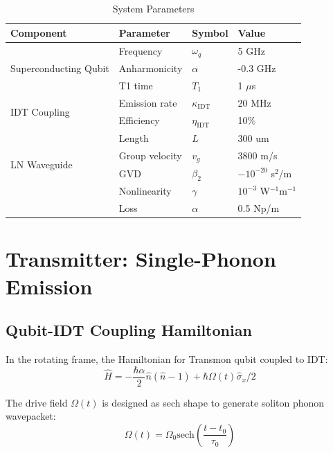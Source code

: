 \documentclass[12pt,a4paper]{article}
\theoremstyle{definition}
\begin{document}
\begin{table}[h]
\centering
\caption{System Parameters}
\begin{tabular}{llll}
\toprule
Component & Parameter & Symbol & Value \\
\midrule
\multirow{3}{*}{Superconducting Qubit} 
& Frequency & $\omega_q$ & 5 GHz \\
& Anharmonicity & $\alpha$ & -0.3 GHz \\
& T1 time & $T_1$ & 1 $\mu$s \\
\midrule
\multirow{2}{*}{IDT Coupling}
& Emission rate & $\kappa_{\text{IDT}}$ & 20 MHz \\
& Efficiency & $\eta_{\text{IDT}}$ & 10\% \\
\midrule
\multirow{4}{*}{LN Waveguide}
& Length & $L$ & 300 um \\
& Group velocity & $v_g$ & 3800 m/s \\
& GVD & $\beta_2$ & $-10^{-20}$ s$^2$/m \\
& Nonlinearity & $\gamma$ & $10^{-3}$ W$^{-1}$m$^{-1}$ \\
& Loss & $\alpha$ & 0.5 Np/m \\
\bottomrule
\end{tabular}
\end{table}

\section{Transmitter: Single-Phonon Emission}

\subsection{Qubit-IDT Coupling Hamiltonian}

In the rotating frame, the Hamiltonian for Transmon qubit coupled to IDT:
\begin{equation}
\hat{H} = -\frac{\hbar\alpha}{2}\hat{n}(\hat{n}-1) + \hbar\Omega(t)\hat{\sigma}_x/2
\end{equation}

The drive field $\Omega(t)$ is designed as sech shape to generate soliton phonon wavepacket:
\begin{equation}
\Omega(t) = \Omega_0\text{sech}\left(\frac{t-t_0}{\tau_0}\right)
\end{equation}
\end{document}
